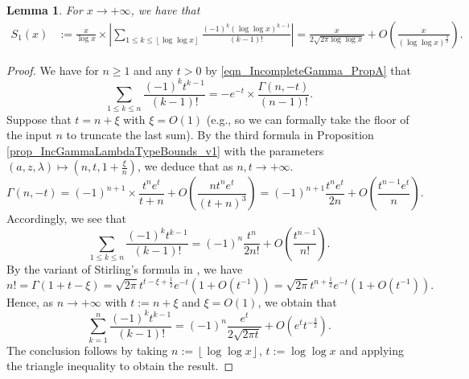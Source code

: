 \documentclass[11pt,reqno,a4letter]{article}
\numberwithin{figure}{section}
\numberwithin{table}{section}
\newcommand{\cf}{\textit{cf.\ }}
\newcommand{\floor}[1]{\left\lfloor #1 \right\rfloor}
\theoremstyle{plain}
\newtheorem{lemma}[theorem]{Lemma}
\numberwithin{theorem}{section}
\theoremstyle{definition}
\begin{document}
\begin{lemma}
\label{lemma_ConvenientIncGammaFuncTypePartialSumAsymptotics_v2}
For $x \rightarrow +\infty$, we have that 
\begin{align*}
S_1(x) & := \frac{x}{\log x} \times \left\lvert \sum_{1 \leq k \leq \floor{\log\log x}} 
     \frac{(-1)^k (\log\log x)^{k-1}}{(k-1)!} \right\rvert 
     = \frac{x}{2\sqrt{2\pi \log\log x}} + O\left(\frac{x}{(\log\log x)^{\frac{3}{2}}}\right). 
\end{align*}
\end{lemma}
\begin{proof}
We have for $n \geq 1$ and any $t > 0$ by 
\eqref{eqn_IncompleteGamma_PropA} that 
\[
\sum_{1 \leq k \leq n} \frac{(-1)^k t^{k-1}}{(k-1)!} = -e^{-t} \times 
     \frac{\Gamma(n, -t)}{(n-1)!}. 
\]
Suppose that $t = n + \xi$ with $\xi = O(1)$ (e.g., so we can 
formally take the floor of the input $n$ to truncate the last sum). 
By the third formula 
in Proposition \ref{prop_IncGammaLambdaTypeBounds_v1} 
with the parameters $(a, z, \lambda) \mapsto \left(n, t, 1 + \frac{\xi}{n}\right)$, 
we deduce that as $n,t \rightarrow +\infty$. 
\begin{equation}
\label{eqn_ProofTag_lemma_ConvenientIncGammaFuncTypePartialSumAsymptotics_v2}
\Gamma(n, -t) = (-1)^{n+1} \times \frac{t^n e^{t}}{t+n} + 
     O\left(\frac{n t^n e^{t}}{(t+n)^3}\right) = 
     (-1)^{n+1} \frac{t^n e^t}{2n} + O\left(\frac{t^{n-1} e^t}{n}\right). 
\end{equation}
Accordingly, we see that 
\[
\sum_{1 \leq k \leq n} \frac{(-1)^k t^{k-1}}{(k-1)!} = 
     (-1)^{n} \frac{t^n}{2n!} + O\left(\frac{t^{n-1}}{n!}\right). 
\]
By the variant of Stirling's formula in \cite[\cf Eq.\ (5.11.8)]{NISTHB}, we have 
\[
n! = \Gamma(1 + t - \xi) = \sqrt{2\pi} t^{t-\xi+\frac{1}{2}} e^{-t} \left(1 + O(t^{-1})\right) = 
     \sqrt{2\pi} t^{n+\frac{1}{2}} e^{-t} \left(1 + O(t^{-1})\right). 
\]
Hence, as $n \rightarrow +\infty$ with $t := n + \xi$ and $\xi = O(1)$, we obtain that 
\[
\sum_{k=1}^{n} \frac{(-1)^k t^{k-1}}{(k-1)!} = (-1)^n \frac{e^t}{2 \sqrt{2\pi t}} + 
     O\left(e^t t^{-\frac{3}{2}}\right). 
\]
The conclusion follows by taking $n := \floor{\log\log x}$, 
$t := \log\log x$ and applying the triangle inequality 
to obtain the result. 
\end{proof}
\end{document}

